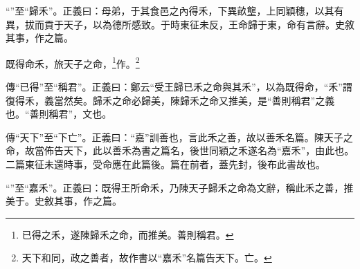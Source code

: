 {\noindent\shu{}\fzkt “”至“歸禾”。正義曰：母弟，于其食邑之內得禾，下異畝壟，上同穎穗，以其有異，拔而貢于天子，以為德所感致。于時東征未反，王命歸于東，命有言辭。史敘其事，作之篇。 \par}

既得命禾，旅天子之命，\footnote{已得之禾，遂陳歸禾之命，而推美。善則稱君。}作。\footnote{天下和同，政之善者，故作書以“嘉禾”名篇告天下。亡。}

{\noindent\zhuan{}\fzbyks 傳“已得”至“稱君”。正義曰：鄭云“受王歸已禾之命與其禾”，以為既得命，“禾”謂復得禾，義當然矣。歸禾之命必歸美，陳歸禾之命又推美，是“善則稱君”之義也。“善則稱君”，文也。 \par}

{\noindent\zhuan{}\fzbyks 傳“天下”至“下亡”。正義曰：“嘉”訓善也，言此禾之善，故以善禾名篇。陳天子之命，故當佈告天下，此以善禾為書之篇名，後世同穎之禾遂名為“嘉禾”，由此也。二篇東征未還時事，受命應在此篇後。篇在前者，蓋先封，後布此書故也。 \par}

{\noindent\shu{}\fzkt “”至“嘉禾”。正義曰：既得王所命禾，乃陳天子歸禾之命為文辭，稱此禾之善，推美于。史敘其事，作之篇。 \par}

